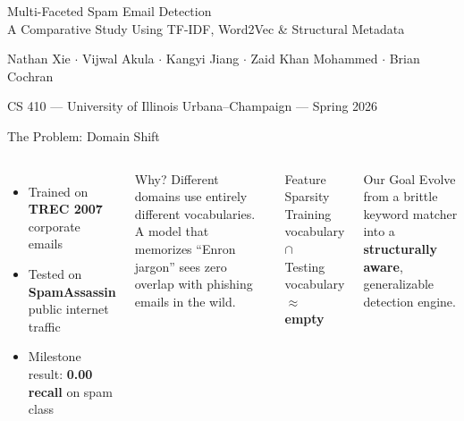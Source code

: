 \documentclass[aspectratio=169, 12pt]{beamer}
\begin{document}
{
\begin{frame}[plain]
\vfill
\centering
{ Multi-Faceted Spam Email Detection\\[4pt]}
{ A Comparative Study Using TF-IDF, Word2Vec \& Structural Metadata}

\vspace{18pt}
{\small\color{textLight}
Nathan Xie $\cdot$ Vijwal Akula $\cdot$ Kangyi Jiang $\cdot$ Zaid Khan Mohammed $\cdot$ Brian Cochran}

\vspace{6pt}
{\footnotesize\color{textMuted} CS 410 --- University of Illinois Urbana--Champaign --- Spring 2026}
\vfill
\end{frame}
}

\begin{frame}{The Problem: Domain Shift}
\begin{columns}[T]
\begin{itemize}
    \item Trained on \textbf{TREC 2007} corporate emails
    \item Tested on \textbf{SpamAssassin} public internet traffic
    \item Milestone result: \textcolor{accentRed}{\textbf{0.00 recall}} on spam class
\end{itemize}

\vspace{10pt}
\begin{alertblock}{Why?}
Different domains use entirely different vocabularies. A model that memorizes ``Enron jargon'' sees zero overlap with phishing emails in the wild.
\end{alertblock}

\begin{block}{Feature Sparsity}
\centering
\vspace{4pt}
\small
Training vocabulary\\
$\cap$\\
Testing vocabulary\\
$\approx$ \textcolor{accentRed}{\textbf{empty}}
\vspace{4pt}
\end{block}

\vspace{8pt}
\begin{exampleblock}{Our Goal}
\small Evolve from a brittle keyword matcher into a \textbf{structurally aware}, generalizable detection engine.
\end{exampleblock}
\end{columns}
\end{frame}
\end{document}
